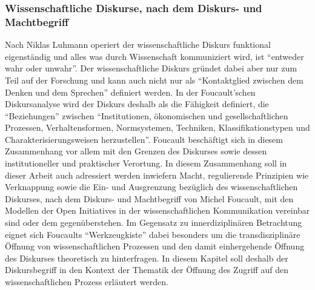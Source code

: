 \subsubsection{Wissenschaftliche Diskurse, nach dem Diskurs- und Machtbegriff}
Nach Niklas Luhmann operiert der wissenschaftliche Diskurs funktional eigenständig und alles was durch Wissenschaft kommuniziert wird, ist “entweder wahr oder unwahr”\cite{Luhmann1998}. Der wissenschaftliche Diskurs gründet dabei aber nur zum Teil auf der Forschung und kann auch nicht nur als “Kontaktglied zwischen dem Denken und dem Sprechen”\cite{foucault_ordnung_2003} definiert werden. In der Foucault'schen Diskursanalyse wird der Diskurs deshalb als die Fähigkeit definiert, die “Beziehungen” zwischen “Institutionen, ökonomischen und gesellschaftlichen Prozessen, Verhaltensformen, Normsystemen, Techniken, Klassifikationstypen und Charakterisierungsweisen herzustellen”\cite{foucault_archaologie_1981}. Foucault beschäftigt sich in diesem Zusammenhang vor allem mit den Grenzen des Diskurses sowie dessen institutioneller und praktischer Verortung. In diesem Zusammenhang soll in dieser Arbeit auch adressiert werden inwiefern Macht, regulierende Prinzipien wie Verknappung sowie die Ein- und Ausgrenzung bezüglich des wissenschaftlichen Diskurses, nach dem Diskurs- und Machtbegriff von Michel Foucault, mit den Modellen der Open Initiatives in der wissenschaftlichen Kommunikation vereinbar sind oder dem gegenüberstehen. Im Gegensatz zu innerdiziplinären Betrachtung eignet sich Foucaults “Werkzeugkiste”\cite{Honneth_2003} dabei besonders um die transdisziplinäre Öffnung von wissenschaftlichen Prozessen und den damit einhergehende Öffnung des Diskurses theoretisch zu hinterfragen. 
In diesem Kapitel soll deshalb der Diskursbegriff in den Kontext der Thematik der Öffnung des Zugriff auf den wissenschaftlichen Prozess erläutert werden.
